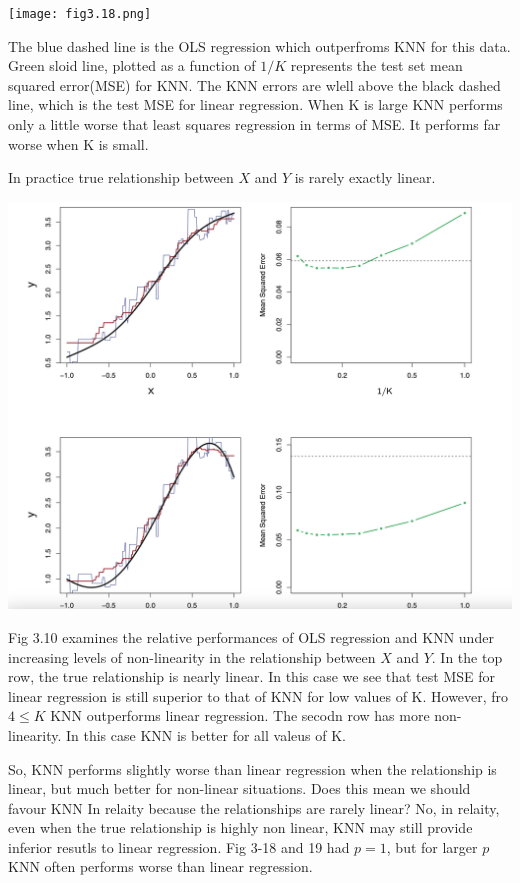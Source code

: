 \documentclass[
  letterpaper,
  DIV=11,
  numbers=noendperiod]{scrreprt}
\begin{document}
\texttt{[image: fig3.18.png]}

The blue dashed line is the OLS regression which outperfroms KNN for
this data. Green sloid line, plotted as a function of \(1/K\) represents
the test set mean squared error(MSE) for KNN. The KNN errors are wlell
above the black dashed line, which is the test MSE for linear
regression. When K is large KNN performs only a little worse that least
squares regression in terms of MSE. It performs far worse when K is
small.

In practice true relationship between \(X\) and \(Y\) is rarely exactly
linear.

\includegraphics{fig3.19.png}

Fig 3.10 examines the relative performances of OLS regression and KNN
under increasing levels of non-linearity in the relationship between
\(X\) and \(Y\). In the top row, the true relationship is nearly linear.
In this case we see that test MSE for linear regression is still
superior to that of KNN for low values of K. However, fro \(4 \leq K\)
KNN outperforms linear regression. The secodn row has more
non-linearity. In this case KNN is better for all valeus of K.

So, KNN performs slightly worse than linear regression when the
relationship is linear, but much better for non-linear situations. Does
this mean we should favour KNN In relaity because the relationships are
rarely linear? No, in relaity, even when the true relationship is highly
non linear, KNN may still provide inferior resutls to linear regression.
Fig 3-18 and 19 had \(p=1\), but for larger \(p\) KNN often performs
worse than linear regression.
\end{document}
